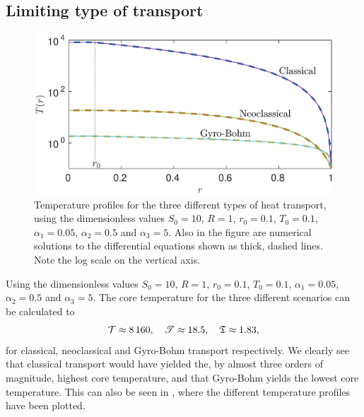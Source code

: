 \documentclass[11pt,a4paper, 
swedish, english %
]{article}
\begin{document}
\subsection*{Limiting type of transport}
\begin{figure}
\centering
\includegraphics[width=12cm]{Q2.eps}
\caption{Temperature profiles for the three different types of heat
  transport, using the dimensionless values $S_0=10$, $R=1$,
  $r_0=0.1$, $T_0=0.1$, $\alpha_1=0.05$, $\alpha_2=0.5$ and
  $\alpha_3=5$. Also in the figure are numerical solutions to the
  differential equations shown as thick, dashed lines. Note the log
  scale on the vertical axis.}
\label{fig:transp}
\end{figure}

Using the dimensionless values $S_0=10$, $R=1$, $r_0=0.1$, $T_0=0.1$,
$\alpha_1=0.05$, $\alpha_2=0.5$ and $\alpha_3=5$. The core temperature
for the three different scenarios can be calculated to
\begin{equation}
\mathcal{T}\approx8\,160\qc
\mathscr{T}\approx18.5\qc
\mathfrak{T}\approx1.83,
\end{equation}
for classical, neoclassical and Gyro-Bohm transport
respectively. We clearly see that classical transport would have
yielded the, by almost three orders of magnitude, highest core
temperature, and that Gyro-Bohm yields the lowest core
temperature. This can also be seen in , where the
different temperature profiles have been plotted. 
\end{document}
